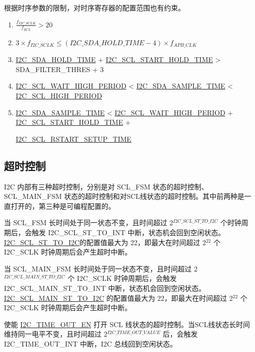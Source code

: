 \documentclass[main\_\_CN.tex]{subfiles}
\begin{document}
根据时序参数的限制，对时序寄存器的配置范围也有约束。
\begin{enumerate}
\item $\frac{f_{I2C\_SCLK}}{f_{SCL}} > 20$
\item $3 \times f_{I2C\_SCLK} \leq (\hyperref[fielddesc:I2CSDAHOLDTIME]{I2C\_SDA\_HOLD\_TIME}-4) \times f_{APB\_CLK}$
\item \hyperref[fielddesc:I2CSDAHOLDTIME]{I2C\_SDA\_HOLD\_TIME} + \hyperref[fielddesc:I2CSCLSTARTHOLDTIME]{I2C\_SCL\_START\_HOLD\_TIME} > SDA\_FILTER\_THRES + 3
\item \hyperref[fielddesc:I2CSCLWAITHIGHPERIOD]{I2C\_SCL\_WAIT\_HIGH\_PERIOD} < \hyperref[fielddesc:I2CSDASAMPLETIME]{I2C\_SDA\_SAMPLE\_TIME} < \hyperref[fielddesc:I2CSCLHIGHPERIOD]{I2C\_SCL\_HIGH\_PERIOD}
\item \hyperref[fielddesc:I2CSDASAMPLETIME]{I2C\_SDA\_SAMPLE\_TIME} < \hyperref[fielddesc:I2CSCLWAITHIGHPERIOD]{I2C\_SCL\_WAIT\_HIGH\_PERIOD} + \hyperref[fielddesc:I2CSCLSTARTHOLDTIME]{I2C\_SCL\_START\_HOLD\_TIME} +

\hyperref[fielddesc:I2CSCLRSTARTSETUPTIME]{I2C\_SCL\_RSTART\_SETUP\_TIME}

\end{enumerate}

\subsection{超时控制}
I2C 内部有三种超时控制，分别是对 SCL\_FSM 状态的超时控制、SCL\_MAIN\_FSM 状态的超时控制和对SCL线状态的超时控制。其中前两种是一直打开的，第三种是可编程配置的。

当 SCL\_FSM 长时间处于同一状态不变，且时间超过 2$^{\hyperref[fielddesc:I2CSCLSTTOI2C]{I2C\_SCL\_ST\_TO\_I2C}}$ 个时钟周期后，会触发 I2C\_SCL\_ST\_TO\_INT 中断，状态机会回到空闲状态。\hyperref[fielddesc:I2CSCLSTTOI2C]{I2C\_SCL\_ST\_TO\_I2C}的配置值最大为 22，即最大在时间超过 2$^{22}$ 个 I2C\_SCLK 时钟周期后会产生超时中断。

当 SCL\_MAIN\_FSM 长时间处于同一状态不变，且时间超过 2$^{ \hyperref[fielddesc:I2CSCLMAINSTTOI2C]{I2C\_SCL\_MAIN\_ST\_TO\_I2C} }$ 个 I2C\_SCLK 时钟周期后，会触发 I2C\_SCL\_MAIN\_ST\_TO\_INT 中断，状态机会回到空闲状态。\hyperref[fielddesc:I2CSCLMAINSTTOI2C]{I2C\_SCL\_MAIN\_ST\_TO\_I2C} 的配置值最大为 22，即最大在时间超过 2$^{22}$ 个 I2C\_SCLK 时钟周期后会产生超时中断。

使能 \hyperref[fielddesc:I2CTIMEOUTEN]{I2C\_TIME\_OUT\_EN} 打开 SCL 线状态的超时控制。当SCL线状态长时间维持同一电平不变，且时间超过 2$^{\hyperref[fielddesc:I2CTIMEOUTVALUE]{I2C\_TIME\_OUT\_VALUE}}$ 后，会触发 I2C\_TIME\_OUT\_INT 中断，I2C 总线回到空闲状态。
\end{document}
